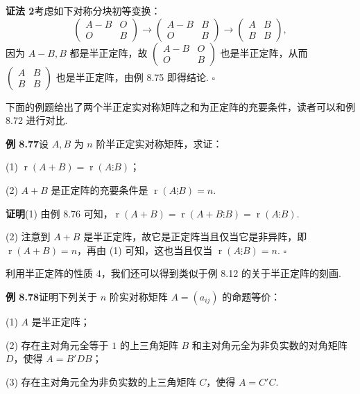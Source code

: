 \documentclass[UTF8, 12pt, fontset=fandol, oneside]{ctexart}
\begin{document}
\noindent\textbf{证法 2}\quad 考虑如下对称分块初等变换：
\[
\left(\begin{array}{cc}
A-B & O\\
O & B
\end{array}\right)
\to
\left(\begin{array}{cc}
A-B & B\\
O & B
\end{array}\right)
\to
\left(\begin{array}{cc}
A & B\\
B & B
\end{array}\right),
\]
因为 $A-B,B$ 都是半正定阵，故 $\left(\begin{array}{cc}A-B&O\\ O&B\end{array}\right)$ 也是半正定阵，从而 $\left(\begin{array}{cc}A&B\\ B&B\end{array}\right)$ 也是半正定阵，由例 8.75 即得结论. $\ensuremath{\square}$

下面的例题给出了两个半正定实对称矩阵之和为正定阵的充要条件，读者可以和例 8.72 进行对比.

\noindent\textbf{例 8.77}\quad 设 $A,B$ 为 $n$ 阶半正定实对称矩阵，求证：

(1) $\operatorname{r}(A+B)=\operatorname{r}(A\vdots B)$；

(2) $A+B$ 是正定阵的充要条件是 $\operatorname{r}(A\vdots B)=n$.

\noindent\textbf{证明}\quad (1) 由例 8.76 可知，$\operatorname{r}(A+B)=\operatorname{r}(A+B\vdots B)=\operatorname{r}(A\vdots B)$.

(2) 注意到 $A+B$ 是半正定阵，故它是正定阵当且仅当它是非异阵，即 $\operatorname{r}(A+B)=n$，再由 (1) 可知，这也当且仅当 $\operatorname{r}(A\vdots B)=n$. $\ensuremath{\square}$

利用半正定阵的性质 4，我们还可以得到类似于例 8.12 的关于半正定阵的刻画.

\noindent\textbf{例 8.78}\quad 证明下列关于 $n$ 阶实对称矩阵 $A=(a_{ij})$ 的命题等价：

(1) $A$ 是半正定阵；

(2) 存在主对角元全等于 $1$ 的上三角矩阵 $B$ 和主对角元全为非负实数的对角矩阵 $D$，使得 $A=B'DB$；

(3) 存在主对角元全为非负实数的上三角矩阵 $C$，使得 $A=C'C$.
\end{document}

